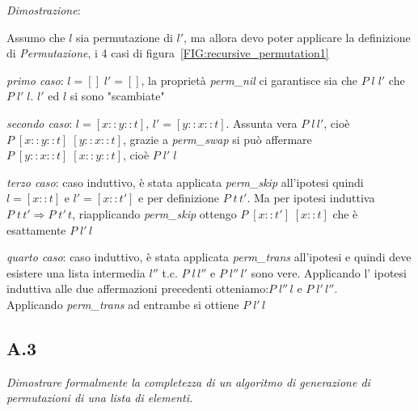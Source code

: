 \documentclass[a4paper]{article}
\newenvironment{dimostrazione}{\textit{Dimostrazione}:\begin{adjustwidth}{1cm}{}}{\end{adjustwidth}}
\begin{document}
\begin{dimostrazione}
	Assumo che $l$ sia permutazione di $l'$, ma allora devo poter applicare la definizione di \textit{Permutazione}, i 4 casi di figura~\ref{FIG:recursive_permutation1} 


	\textit{primo caso}: $l=[] \; l'=[]$, la proprietà \emph{perm\_nil} ci garantisce sia che $P \;l \; l'$ che $P \; l'\; l$. $l'$ ed $l$ si sono "scambiate"


	\textit{secondo caso}: $l = [x::y::t]$, $l'= [y::x::t]$. Assunta vera $P \; l \, l'$, cioè $P \; [x::y::t] \; [y::x::t]$, grazie a \emph{perm\_swap} si può affermare $P \; [y::x::t] \; [x::y::t]$, cioè $P \; l' \; l$

	\textit{terzo caso}: caso induttivo, è stata applicata \textit{perm\_skip} all'ipotesi quindi $l = [x::t]$ e $l' = [x::t']$ e per definizione $P \; t \, t'$.
	Ma per ipotesi induttiva $P \; t \, t' \Rightarrow P \; t' \, t$, riapplicando \textit{perm\_skip} ottengo $P \; [x::t'] \; [x::t]$ che è esattamente $P \; l' \, l$

	\textit{quarto caso}: caso induttivo, è stata applicata \textit{perm\_trans} all'ipotesi e quindi deve esistere una lista intermedia $l''$ t.c. $P\; l\, l''$ e $P \; l''\, l'$ sono vere.
	Applicando l' ipotesi induttiva alle due affermazioni precedenti otteniamo:$P\; l''\, l$ e $P \; l'\, l''$.\\
	Applicando \textit{perm\_trans} ad entrambe si ottiene $P \; l' \, l$
\end{dimostrazione}
\subsection{A.3}
\emph{Dimostrare formalmente la completezza di un algoritmo di generazione di permutazioni di una lista di elementi.}
\end{document}
